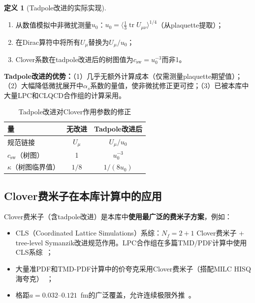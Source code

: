 \documentclass[12pt,a4paper]{ctexart}
\theoremstyle{definition}
\newtheorem{definition}{定义}[section]
\begin{document}
\begin{definition}[Tadpole改进的实际实现]
\begin{enumerate}[nosep]
    \item 从数值模拟中非微扰测量$u_0$：$u_0 = \langle \frac{1}{3}\operatorname{tr} U_{\mu\nu} \rangle^{1/4}$（从plaquette提取）；
    \item 在Dirac算符中将所有$U_\mu$替换为$U_\mu/u_0$；
    \item Clover系数在tadpole改进后的树图值为$c_{\text{sw}} = u_0^{-3}$而非1。
\end{enumerate}
\end{definition}

\textbf{Tadpole改进的优势：}（1）几乎无额外计算成本（仅需测量plaquette期望值）；（2）大幅降低微扰展开中$\alpha_s$系数的量值，使非微扰修正更可控；（3）已被本库中大量LPC和CLQCD合作组的计算采用。

\begin{table}[H]
\centering
\caption{Tadpole改进对Clover作用参数的修正}
\label{tab:tadpole_csw}
\begin{tabular}{lcc}
\toprule
量 & 无改进 & Tadpole改进后 \\
\midrule
规范链接 & $U_\mu$ & $U_\mu/u_0$ \\
$c_{\text{sw}}$（树图） & 1 & $u_0^{-3}$ \\
$\kappa$（树图临界值） & $1/8$ & $1/(8u_0)$ \\
\bottomrule
\end{tabular}
\end{table}

\subsection{Clover费米子在本库计算中的应用}

Clover费米子（含tadpole改进）是本库中\textbf{使用最广泛的费米子方案}，例如：
\begin{itemize}
    \item CLS（Coordinated Lattice Simulations）系综：$N_f = 2+1$ Clover费米子 + tree-level Symanzik改进规范作用。LPC合作组在多篇TMD/PDF计算中使用CLS系综~\cite{Chu2023soft,Chu2023TMDWF}；
    \item 大量准PDF和TMD-PDF计算中的价夸克采用Clover费米子（搭配MILC HISQ海夸克）~\cite{He2024unpolTMD,Ma2025BoerMulders}；
    \item 格距$a = 0.032\text{--}0.121$~fm的广泛覆盖，允许连续极限外推~\cite{Zhang2022renormTMD}。
\end{itemize}
\end{document}
